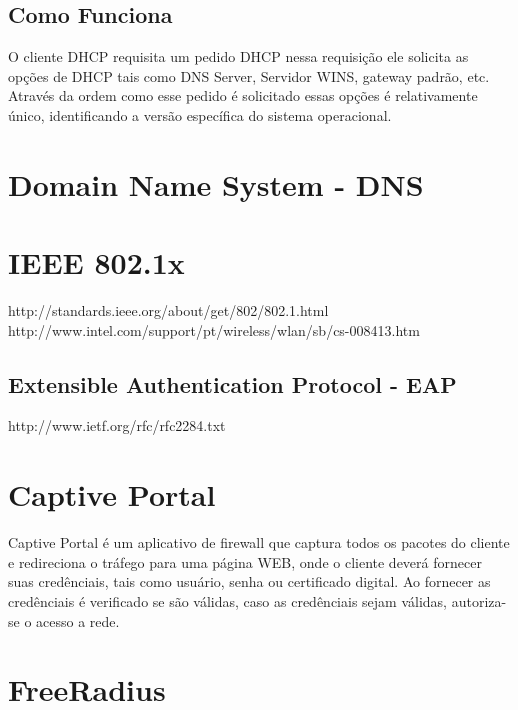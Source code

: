 \documentclass[12pt, brazil, ruledheader, pnumromarab,normaltoc]{abnt}
\begin{document}
\subsection{Como Funciona}
O cliente DHCP requisita um pedido DHCP nessa requisição ele solicita as opções de DHCP tais como DNS Server, Servidor WINS, gateway padrão, etc. Através da ordem como esse pedido é solicitado essas opções é relativamente único, identificando a versão específica do sistema operacional.
\cite{fingerbank}

\section{Domain Name System - DNS}

\section{IEEE 802.1x}\label{sec:802.1x}
http://standards.ieee.org/about/get/802/802.1.html
http://www.intel.com/support/pt/wireless/wlan/sb/cs-008413.htm

\subsection{Extensible Authentication Protocol - EAP}
http://www.ietf.org/rfc/rfc2284.txt

\section{Captive Portal}\label{sec:captive}
Captive Portal é um aplicativo de firewall que captura todos os pacotes do cliente e redireciona o tráfego para uma página WEB, onde o cliente deverá fornecer suas credênciais, tais como usuário, senha ou certificado digital. Ao fornecer as credênciais é verificado se são válidas, caso as credênciais sejam válidas, autoriza-se o acesso a rede.
\cite{captive}

\section{FreeRadius}\label{sec:radius}


\end{document}
